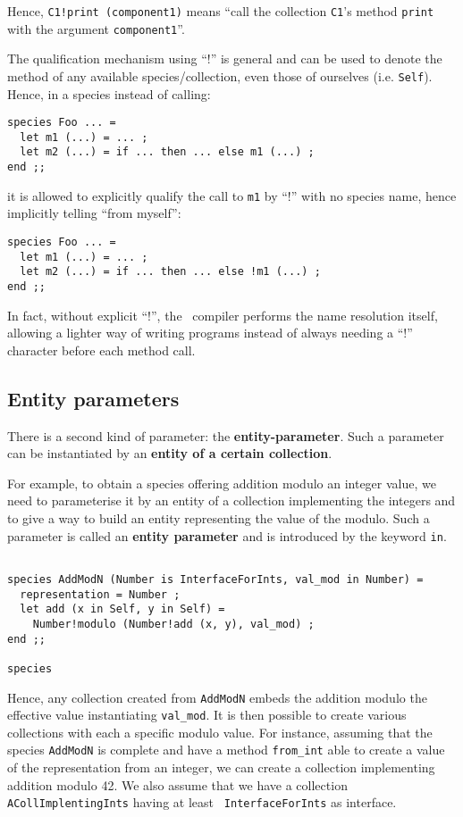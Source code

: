 Hence, {\tt C1!print (component1)} means ``call the collection
{\tt C1}'s method {\tt print} with the argument {\tt component1}''. 

The
qualification mechanism using ``!'' is general and can be used to
denote the method of any available species/collection, even those of
ourselves (i.e. {\tt Self}). Hence, in a species instead of calling:
{\scriptsize
\begin{lstlisting}
species Foo ... =
  let m1 (...) = ... ;
  let m2 (...) = if ... then ... else m1 (...) ;
end ;;
\end{lstlisting}
}
it is allowed to explicitly qualify the call to {\tt m1} by ``!''
with no species name, hence implicitly telling ``from myself'':
{\scriptsize
\begin{lstlisting}
species Foo ... =
  let m1 (...) = ... ;
  let m2 (...) = if ... then ... else !m1 (...) ;
end ;;
\end{lstlisting}
}
In fact, without explicit ``!'', the \focal\ compiler performs the
name resolution itself, allowing a lighter way of writing programs
instead of always needing a ``!'' character before each method call.



\subsection{Entity parameters}
\label{entity-parameter}
There is a second kind of parameter: the {\bf entity-parameter}. Such
a parameter can be instantiated by an {\bf entity of a certain
  collection}.  

For example, to obtain a species offering addition modulo an
integer value, we need to parameterise it by an entity of a collection
implementing the integers and to give a way to build an entity
representing the value of the modulo. Such a parameter is called an
{\bf entity parameter} and is introduced by the keyword {\tt in}.
{\scriptsize
\begin{lstlisting}

species AddModN (Number is InterfaceForInts, val_mod in Number) =
  representation = Number ;
  let add (x in Self, y in Self) =
    Number!modulo (Number!add (x, y), val_mod) ;
end ;;

species
\end{lstlisting}
}

Hence, any collection created from {\tt AddModN} embeds the addition
modulo the effective value instantiating {\tt val\_mod}. It is then
possible to create various collections with each a specific modulo
value. For instance, assuming that the species {\tt AddModN} is
complete and have a method {\tt from\_int} able to create a value of
the representation from an integer, we can create a collection
implementing addition modulo 42. We also assume that we have a
collection {\tt ACollImplentingInts} having at least {\tt
  InterfaceForInts} as interface. 

